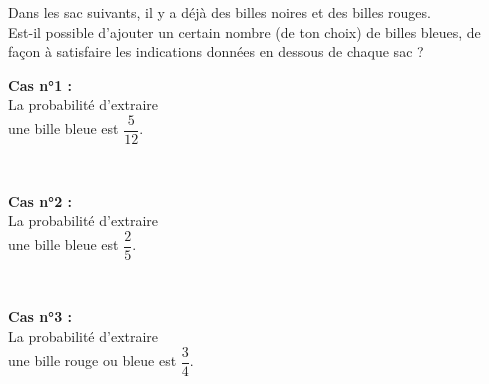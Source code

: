 \begin{exercice*}
  Dans les sac suivants, il y a déjà des billes noires et des billes rouges. \\
  Est-il possible d’ajouter un certain nombre (de ton choix) de billes bleues, de façon à satisfaire les indications données en dessous de chaque sac ? \\ [1mm]
  \begin{minipage}{2.5cm} %
  \end{minipage}
  \begin{minipage}{5.5cm}
     {\bf Cas n°1 :} \\
     La probabilité d'extraire \\ une bille bleue est $\dfrac{5}{12}$.
  \end{minipage} \\
  \begin{minipage}{2.5cm} %
  \end{minipage}
  \begin{minipage}{5.5cm}
     {\bf Cas n°2 :} \\
     La probabilité d'extraire \\
     une bille bleue est $\dfrac{2}{5}$.
  \end{minipage} \\
  \begin{minipage}{2.5cm} %
  \end{minipage}
  \begin{minipage}{5.5cm}
     {\bf Cas n°3 :} \\
     La probabilité d'extraire \\
     une bille rouge ou bleue est $\dfrac{3}{4}$.
  \end{minipage}
\end{exercice*}
